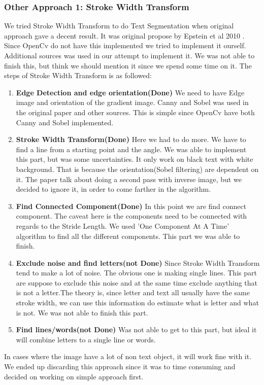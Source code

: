 \documentclass[Report.tex]{subfiles}
\begin{document}
\begin{flushleft}
  \subsubsection{Other Approach 1: Stroke Width Transform}
  We tried Stroke Width Transform to do Text Segmentation when original approach gave a decent result. It was original propose by Epstein et al 2010 \cite{epshtein_stroke_2010}. Since OpenCv do not have this implemented we tried to implement it ourself. Additional sources was used in our attempt to implement it\cite{werner_text_????, _c++_????, bunn_strokewidthtransform:_2018}. We was not able to finish this, but think we should mention it since we spend some time on it. The steps of Stroke Width Transform is as followed:
  \begin{enumerate}
    \item \textbf{Edge Detection and edge orientation(Done)}
    We need to have Edge image and orientation of the gradient image.
    Canny and Sobel was used in the original paper and other sources. This is simple since OpenCv have both Canny and Sobel implemented.
    \item \textbf{Stroke Width Transform(Done)}
    Here we had to do more. We have to find a line from a starting point and the angle. We was able to implement this part, but was some uncertainties. It only work on black text with white background. That is because the orientation(Sobel filtering) are dependent on it. The paper talk about doing a second pass with inverse image, but we decided to ignore it, in order to come farther in the algorithm.
    \item \textbf{Find Connected Component(Done)}
    In this point we are find connect component. The caveat here is the components need to be connected with regards to the Stride Length. We used 'One Component At A Time' algorithm to find all the different components. This part we was able to finish.
    \item \textbf{Exclude noise and find letters(not Done)}
    Since Stroke Width Transform tend to make a lot of noise. The obvious one is making single lines. This part are suppose to exclude this noise and at the same time exclude anything that is not a letter.The theory is, since letter and text all usually have the same stroke width, we can use this information do estimate what is letter and what is not. We was not able to finish this part.
    \item \textbf{Find lines/words(not Done)}
    Was not able to get to this part, but ideal it will combine letters to a single line or words.
  \end{enumerate}
  In cases where the image have a lot of non text object, it will work fine with it. We ended up discarding this approach since it was to time consuming and decided on working on simple approach first.
\end{flushleft}
\end{document}
